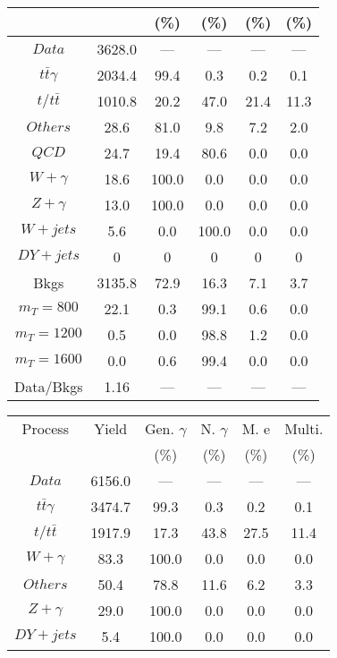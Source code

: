 \begin{figure}
\begin{minipage}[c]{0.32\textwidth}
{\begin{tabular}{cccccc}
 &  & (\%) & (\%) & (\%) & (\%)  \\
\hline
                                                                      $ Data $ &  3628.0 &  --- &  --- &  --- &  ---\\
$ t\bar{t}\gamma $ &  2034.4 &  99.4 &  0.3 &  0.2 &  0.1\\
$ t/t\bar{t} $ &  1010.8 &  20.2 &  47.0 &  21.4 &  11.3\\
$ Others $ &  28.6 &  81.0 &  9.8 &  7.2 &  2.0\\
$ QCD $ &  24.7 &  19.4 &  80.6 &  0.0 &  0.0\\
$ W+\gamma $ &  18.6 &  100.0 &  0.0 &  0.0 &  0.0\\
$ Z+\gamma $ &  13.0 &  100.0 &  0.0 &  0.0 &  0.0\\
$ W+jets $ &  5.6 &  0.0 &  100.0 &  0.0 &  0.0\\
$ DY+jets $ &  0 &  0 &  0 &  0 &  0\\
Bkgs &  3135.8 &  72.9 &  16.3 &  7.1 &  3.7\\
$ m_{T} = 800 $ &  22.1 &  0.3 &  99.1 &  0.6 &  0.0\\
$ m_{T} = 1200 $ &  0.5 &  0.0 &  98.8 &  1.2 &  0.0\\
$ m_{T} = 1600 $ &  0.0 &  0.6 &  99.4 &  0.0 &  0.0\\
Data/Bkgs &  1.16 &  --- &  --- &  --- &  ---\\
\hline
\end{tabular}
}
\end{minipage}
\begin{minipage}[c]{0.32\textwidth}
\centering
\tiny{
\begin{tabular}{cccccc}
\hline
Process & Yield & Gen. $\gamma$ & N. $\gamma$ & M. e & Multi. \\
 &  & (\%) & (\%) & (\%) & (\%)  \\
\hline
                                                                      $ Data $ &  6156.0 &  --- &  --- &  --- &  ---\\
$ t\bar{t}\gamma $ &  3474.7 &  99.3 &  0.3 &  0.2 &  0.1\\
$ t/t\bar{t} $ &  1917.9 &  17.3 &  43.8 &  27.5 &  11.4\\
$ W+\gamma $ &  83.3 &  100.0 &  0.0 &  0.0 &  0.0\\
$ Others $ &  50.4 &  78.8 &  11.6 &  6.2 &  3.3\\
$ Z+\gamma $ &  29.0 &  100.0 &  0.0 &  0.0 &  0.0\\
$ DY+jets $ &  5.4 &  100.0 &  0.0 &  0.0 &  0.0\\

\end{tabular}}
\end{minipage}
\end{figure}
